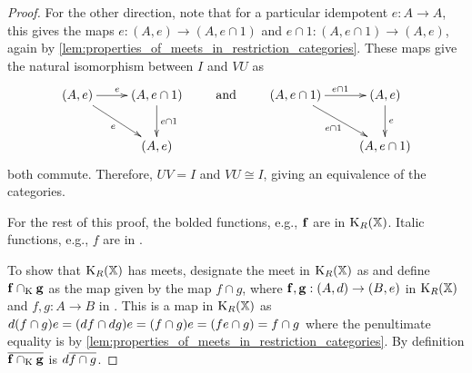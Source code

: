 \begin{proof}
      For the other direction,  note that for a particular idempotent $e:A\to A$,  this gives the 
      maps $e:(A,e)\to(A,e\cap 1)$ and $e\cap 1 : (A,e\cap 1) \to (A,e)$, again by 
      \vref{lem:properties_of_meets_in_restriction_categories}. These maps give the natural 
      isomorphism between $I$ and $V U$ as
      \[
        \xymatrix{
          (A,e)\ar[r]^e \ar[dr]_{e} &(A,e\cap 1)\ar[d]^{e\cap 1}\\
          &(A,e) 
        }\qquad \text{ and  }\qquad
        \xymatrix{
          (A,e\cap 1)\ar[r]^{e\cap 1} \ar[dr]_{e\cap 1} &(A,e)\ar[d]^{e}\\
          &(A,e\cap 1) 
        }
      \]
      both commute. Therefore, $U V = I$ and $V U \cong I$, giving an equivalence of the categories.

      For the rest of this proof, the bolded functions, e.g., $\mathbf{f}$ are in $\text{K}_{R}(\mathbb{X})$.
      Italic functions, e.g., $f$ are in \X.

      To show that $\text{K}_{R}(\mathbb{X})$ has meets,  designate the meet in $\text{K}_{R}(\mathbb{X})$ as \capspl
      and define $\mathbf{f} \cap_{\text{K}} \mathbf{g}$ as the map given by the \X map $f \cap g$, where
      $\mathbf{f},\mathbf{g}:(A,d)\to(B,e)$ in $\text{K}_{R}(\mathbb{X})$ and $f,g:A\to B$ in \X . This is
      a map in $\text{K}_{R}(\mathbb{X})$ as
      $d(f \cap g)e = (d\hspace{0.1pt} f \cap d\hspace{0.1pt} g) e = (f \cap g) e = (f e \cap g) = f\cap g$
      where the penultimate equality is by 
      \vref{lem:properties_of_meets_in_restriction_categories}. 
      By definition $\overline{\mathbf{f} \cap_{\text{K}} \mathbf{g} }$ is $d\overline{f\cap g}$.


\end{proof}
